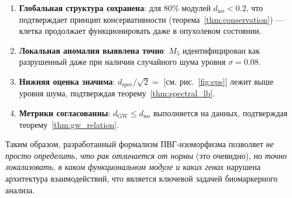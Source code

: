 \begin{enumerate}
    \item \textbf{Глобальная структура сохранена}: для 80\% модулей $d_{\mathrm{iso}} < 0.2$,
          что подтверждает принцип консервативности (теорема~\ref{thm:conservation}) —
          клетка продолжает функционировать даже в опухолевом состоянии.
    \item \textbf{Локальная аномалия выявлена точно}: $M_5$ идентифицирован как
          разрушенный даже при наличии случайного шума уровня $\sigma = 0.08$.
    \item \textbf{Нижняя оценка значима}: $d_{\mathrm{spec}}/\sqrt{2} = $ [см. рис.~\ref{fig:eps}]
          лежит выше уровня шума, подтверждая теорему~\ref{thm:spectral_lb}.
    \item \textbf{Метрики согласованны}: $d_{\mathrm{GW}} \le d_{\mathrm{iso}}$
          выполняется на данных, подтверждая теорему~\ref{thm:gw_relation}.
\end{enumerate}

Таким образом, разработанный формализм ПВГ-изоморфизма позволяет
\emph{не просто определить, что рак отличается от нормы} (это очевидно),
но \emph{точно локализовать, в каком функциональном модуле и каких генах}
нарушена архитектура взаимодействий, что является ключевой задачей биомаркерного анализа.

